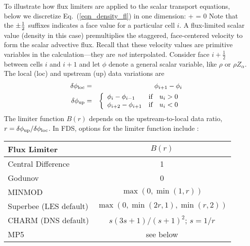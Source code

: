 To illustrate how flux limiters are applied to the scalar transport equations, below we discretize Eq.~(\ref{eqn_density_fl}) in one dimension:
\be  {}
    +  = 0
\ee
Note that the $\pm\frac{1}{2}$ suffixes indicates a face value for a particular cell $i$. A flux-limited scalar value (density in this case) premultiplies the staggered, face-centered velocity to form the scalar advective flux.  Recall that these velocity values are primitive variables in the calculation---they are \emph{not} interpolated.
Consider face $i+\frac{1}{2}$ between cells $i$ and $i+1$ and let $\phi$ denote a general scalar variable, like $\rho$ or $\rho Z_\alpha$.  The local (loc) and upstream (up) data variations are
\begin{eqnarray}
\delta \phi_{\rm loc} &=& \phi_{i+1}-\phi_i \\
\delta \phi_{\rm up}  &=& \left\{ \begin{array}{ll} \phi_i-\phi_{i-1} & \mbox{if} \quad u_i>0 \\ \phi_{i+2}-\phi_{i+1} & \mbox{if} \quad u_i<0 \end{array} \right.
\end{eqnarray}
The limiter function $B(r)$ depends on the upstream-to-local data ratio, $r=\delta \phi_{\rm up}/\delta \phi_{\rm loc}$. In FDS, options for the limiter function include \cite{Toro}:
\begin{table}[H]
\begin{center}
\begin{tabular}{lc}
Flux Limiter                           & $B(r)$                         \\
\hline
Central Difference                     & 1                              \\
Godunov                                & 0                              \\
MINMOD                                 & $\max(0,\min(1,r))$            \\
Superbee \cite{Roe:1986} (LES default) & $\max(0,\min(2r,1),\min(r,2))$ \\
CHARM \cite{Zhou:1995} (DNS default)   & $s(3s+1)/(s+1)^2$; $s=1/r$     \\
MP5 \cite{Suresh:1997}                 & see below
\end{tabular}
\end{center}
\end{table}
